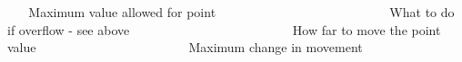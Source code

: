 ~\newline
~\newline
 Maximum value allowed for point ~\newline
~\newline
~\newline
~\newline
~\newline
~\newline
~\newline
~\newline
~\newline
~\newline
~\newline
~\newline
~\newline
~\newline
~\newline
~\newline
 What to do if overflow -\/ see above ~\newline
~\newline
~\newline
~\newline
~\newline
~\newline
~\newline
~\newline
~\newline
~\newline
~\newline
~\newline
~\newline
~\newline
~\newline
 How far to move the point value ~\newline
~\newline
~\newline
~\newline
~\newline
~\newline
~\newline
~\newline
~\newline
~\newline
~\newline
~\newline
~\newline
~\newline
 Maximum change in movement ~\newline
~\newline
~\newline
